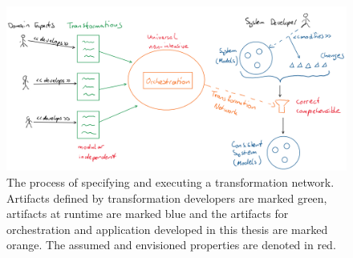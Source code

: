 
\begin{figure}
    \centering
    \includegraphics[width=\textwidth]{figures/prologue/introduction/overall_process.png}
    \caption[Process of specifying and executing a transformation network]{The process of specifying and executing a transformation network. 
    Artifacts defined by transformation developers are marked green, artifacts at runtime are marked blue and the artifacts for orchestration and application developed in this thesis are marked orange. The assumed and envisioned properties are denoted in red.}
    \label{fig:introduction:process_overview}
\end{figure}

